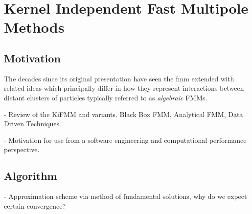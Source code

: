 
\section{Kernel Independent Fast Multipole Methods}\label{chpt:fmm:sec:kifmm}

\subsection{Motivation}

The decades since its original presentation have seen the \acrshort{fmm} extended with related ideas which principally differ in how they represent interactions between distant clusters of particles typically referred to as \textit{algebraic} FMMs.

- Review of the KiFMM and variants. Black Box FMM, Analytical FMM, Data Driven Techniques.

- Motivation for use from a software engineering and computational performance perspective.

\subsection{Algorithm}

- Approximation scheme via method of fundamental solutions, why do we expect certain convergence?


